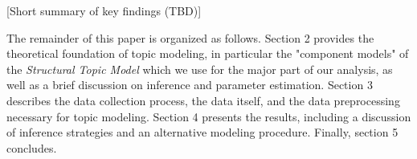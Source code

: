 \vspace{0.5cm}
[Short summary of key findings (TBD)]
\vspace{0.5cm}

The remainder of this paper is organized as follows. Section 2 provides the theoretical foundation of topic modeling, in particular the "component models" of the \textit{Structural Topic Model} which we use for the major part of our analysis, as well as a brief discussion on inference and parameter estimation. Section 3 describes the data collection process, the data itself, and the data preprocessing necessary for topic modeling. Section 4 presents the results, including a discussion of inference strategies and an alternative modeling procedure. Finally, section 5 concludes.